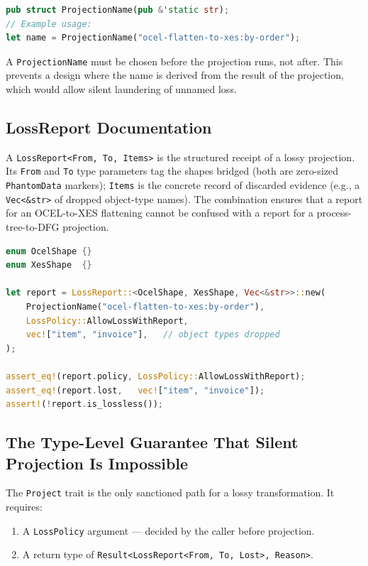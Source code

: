 \begin{lstlisting}[language=Rust]
pub struct ProjectionName(pub &'static str);
// Example usage:
let name = ProjectionName("ocel-flatten-to-xes:by-order");
\end{lstlisting}

A \texttt{ProjectionName} must be chosen before the projection runs, not
after. This prevents a design where the name is derived from the result of the
projection, which would allow silent laundering of unnamed loss.

\subsection{LossReport Documentation}

A \texttt{LossReport<From, To, Items>} is the structured receipt of a lossy
projection. Its \texttt{From} and \texttt{To} type parameters tag the shapes
bridged (both are zero-sized \texttt{PhantomData} markers); \texttt{Items} is
the concrete record of discarded evidence (e.g., a \texttt{Vec<\&str>} of
dropped object-type names). The combination ensures that a report for an
OCEL-to-XES flattening cannot be confused with a report for a
process-tree-to-DFG projection.

\begin{lstlisting}[language=Rust, caption={A \texttt{LossReport} for
  an OCEL-to-XES flattening. The \texttt{From}/\texttt{To} phantom tags
  prevent the report from being confused with one for a different projection
  pair.}, label={lst:lossreport}]
enum OcelShape {}
enum XesShape  {}

let report = LossReport::<OcelShape, XesShape, Vec<&str>>::new(
    ProjectionName("ocel-flatten-to-xes:by-order"),
    LossPolicy::AllowLossWithReport,
    vec!["item", "invoice"],   // object types dropped
);

assert_eq!(report.policy, LossPolicy::AllowLossWithReport);
assert_eq!(report.lost,   vec!["item", "invoice"]);
assert!(!report.is_lossless());
\end{lstlisting}

\subsection{The Type-Level Guarantee That Silent Projection Is Impossible}

The \texttt{Project} trait is the only sanctioned path for a lossy
transformation. It requires:

\begin{enumerate}
  \item A \texttt{LossPolicy} argument --- decided by the caller before projection.
  \item A return type of \texttt{Result<LossReport<From, To, Lost>, Reason>}.
\end{enumerate}

